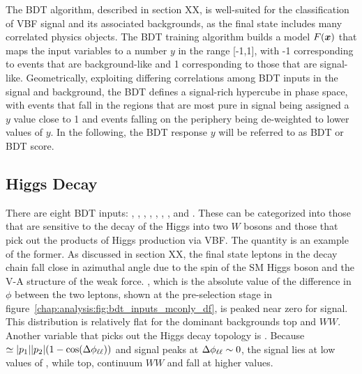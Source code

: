 
The BDT algorithm, described in section XX, is well-suited for the
classification of VBF signal and its associated backgrounds, as the
final state includes many correlated physics objects. The BDT training
algorithm builds a model $F(\boldsymbol{x})$ that maps the input variables
 to a number $y$ in the range [-1,1], with -1 corresponding to
events that are background-like and 1 corresponding to those that are
signal-like. Geometrically, exploiting differing correlations among
BDT inputs in the signal and background, the BDT defines a signal-rich hypercube in
phase space, with events that fall in the regions that are most pure
in signal being assigned a $y$ value close to 1 and events falling on the
periphery being de-weighted to lower values of $y$. In the following,
the BDT response $y$ will be referred to as BDT or BDT score.

\subsection{Higgs Decay}

There are eight BDT
inputs: \dphill, \mll, \mT, \mjj, \dyjj, \pTtot, \lepEtaCent,
and \SumMlj. These can be categorized into those that are
sensitive to the decay of the Higgs into two $W$ bosons and those that
pick out the products of Higgs production via VBF. The
quantity \dphill is an example of the former. As discussed in
section XX, the final state leptons in the decay chain \hwwlnln fall close in
azimuthal angle due to the spin of the SM Higgs boson and the V-A
structure of the weak force. \dphill, which is the
absolute value of the difference in $\phi$ between the two leptons,
shown at the pre-selection stage in figure~\ref{chap:analysis:fig:bdt_inputs_mconly_df}, is peaked near zero
for signal. This distribution is relatively flat for the dominant
backgrounds top and $WW$. Another variable that picks out the Higgs
decay topology is \mll. Because \mll~$\simeq|p_1||p_2|(1-\cos(\Delta\phi_{\ell\ell}))$
and signal peaks at $\Delta\phi_{\ell\ell} \sim 0$, the signal lies at low
values of \mll, while top, continuum $WW$ and \ZDY fall at higher
values. 

